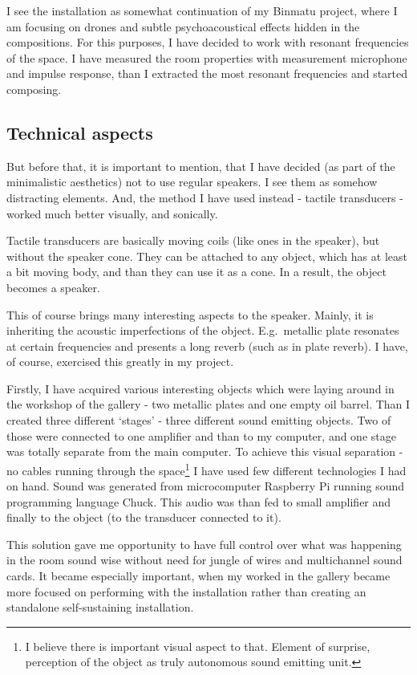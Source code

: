 \documentclass[12pt,a4paper,oneside]{report}
\begin{document}
I see the installation as somewhat continuation of my Binmatu project, where I am focusing on drones and subtle psychoacoustical effects hidden in the compositions. For this purposes, I have decided to work with resonant frequencies of the space. I have measured the room properties with measurement microphone and impulse response, than I extracted the most resonant frequencies and started composing.

\subsection{Technical aspects}

But before that, it is important to mention, that I have decided (as part of the minimalistic aesthetics) not to use regular speakers. I see them as somehow distracting elements. And, the method I have used instead - tactile transducers - worked much better visually, and sonically.

Tactile transducers are basically moving coils (like ones in the speaker), but without the speaker cone. They can be attached to any object, which has at least a bit moving body, and than they can use it as a cone. In a result, the object becomes a speaker. 

This of course brings many interesting aspects to the speaker. Mainly, it is inheriting the acoustic imperfections of the object. E.g.\ metallic plate resonates at certain frequencies and presents a long reverb (such as in plate reverb). I have, of course, exercised this greatly in my project.

Firstly, I have acquired various interesting objects which were laying around in the workshop of the gallery - two metallic plates and one empty oil barrel. Than I created three different `stages' - three different sound emitting objects. Two of those were connected to one amplifier and than to my computer, and one stage was totally separate from the main computer. To achieve this visual separation - no cables running through the space\footnote{I believe there is important visual aspect to that. Element of surprise, perception of the object as truly autonomous sound emitting unit.} I have used few different technologies I had on hand. Sound was generated from microcomputer Raspberry Pi running sound programming language Chuck. This audio was than fed to small amplifier and finally to the object (to the transducer connected to it).

This solution gave me opportunity to have full control over what was happening in the room sound wise without need for jungle of wires and multichannel sound cards. It became especially important, when my worked in the gallery became more focused on performing with the installation rather than creating an standalone self-sustaining installation.
\end{document}
